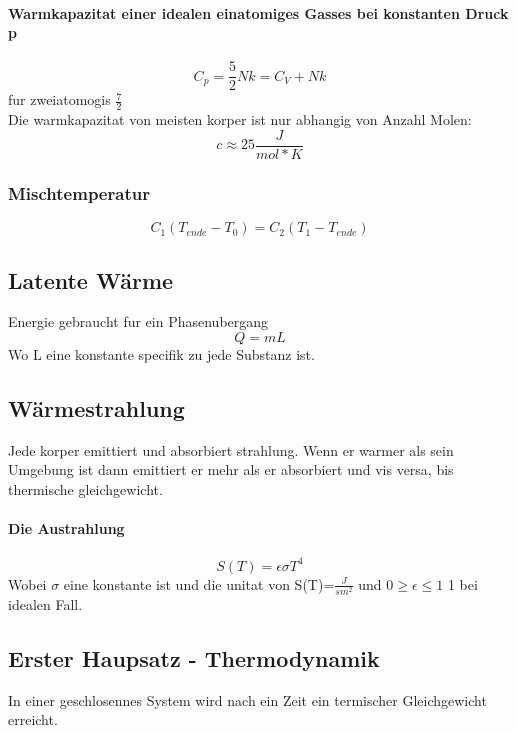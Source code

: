 \documentclass[7pt]{article}
\begin{document}
\begin{multicols*}{3}
\paragraph{Warmkapazitat einer idealen einatomiges Gasses bei konstanten Druck p}
\begin{equation}
	C_p=\frac{5}{2}Nk = C_V+Nk
\end{equation}
fur zweiatomogis $\frac{7}{2}$\\
Die warmkapazitat von meisten korper ist nur abhangig von Anzahl Molen:
\begin{equation}
	c\approx 25\frac{J}{mol*K}
\end{equation}
\subsubsection{Mischtemperatur}
\begin{equation}
	C_1(T_{ende}-T_0)=C_2(T_{1}-T_{ende})
\end{equation}


\subsection{Latente W{\"a}rme}
Energie gebraucht fur ein Phasenubergang
\begin{equation}
	Q=mL
\end{equation}
Wo L eine konstante specifik zu jede Substanz ist.

\subsection{W{\"a}rmestrahlung}
Jede korper emittiert und absorbiert strahlung. Wenn er warmer als sein Umgebung ist dann emittiert er mehr als er absorbiert und vis versa, bis thermische gleichgewicht.
\paragraph{Die Austrahlung}
\begin{equation}
	S(T)=\epsilon\sigma T^4
\end{equation}
Wobei $\sigma$ eine konstante ist und die unitat von S(T)=$\frac{J}{sm^2}$ und $0\geq\epsilon \leq 1$ 1 bei idealen Fall.

\subsection{Erster Haupsatz - Thermodynamik}
In einer geschlosennes System wird nach ein Zeit ein termischer Gleichgewicht erreicht.

\end{multicols*}
\end{document}
